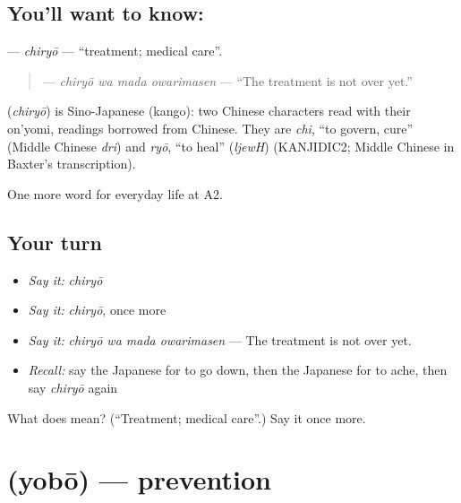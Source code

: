 \subsection*{You'll want to know: }
\textbf{} — \emph{chiryō} — \textquotedblleft{}treatment; medical care\textquotedblright{}.

\begin{quote}
\textbf{  } — \emph{chiryō wa mada owarimasen} — \textquotedblleft{}The treatment is not over yet.\textquotedblright{}
\end{quote}

\begin{cousinweb}
\textbf{} (\emph{chiryō}) is Sino-Japanese (kango): two Chinese characters read with their on'yomi, readings borrowed from Chinese. They are \emph{chi}, \textquotedblleft{}to govern, cure\textquotedblright{} (Middle Chinese \emph{dri}) and \emph{ryō}, \textquotedblleft{}to heal\textquotedblright{} (\emph{ljewH}) (KANJIDIC2; Middle Chinese in Baxter's transcription).
\end{cousinweb}

\begin{grammarlens}[title={What you've built}]
One more word for everyday life at A2.
\end{grammarlens}

\subsection*{Your turn}
\begin{itemize}
\raggedright
  \item \emph{Say it:} \emph{chiryō}
  \item \emph{Say it:} \emph{chiryō}, once more
  \item \emph{Say it:} \emph{chiryō wa mada owarimasen} — The treatment is not over yet.
  \item \emph{Recall:} say the Japanese for to go down, then the Japanese for to ache, then say \emph{chiryō} again
\end{itemize}

\begin{tcolorbox}[breakable,colback=teal!4,colframe=teal!35!black,title={Before you move on}]
What does  mean? (\textquotedblleft{}Treatment; medical care\textquotedblright{}.) Say it once more.
\end{tcolorbox}
\section[\texorpdfstring{\ja{よぼう} (yobō)}{よぼう (yobō)}]{ (yobō) — prevention}

